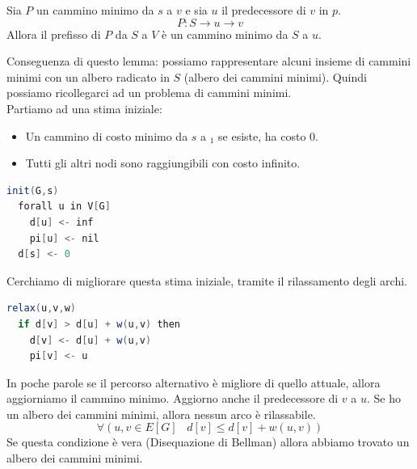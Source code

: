 \documentclass[a4paper]{article}
\begin{document}
\begin{lemma}
  Sia $P$ un cammino minimo da $s$ a $v$ e sia $u$ il predecessore di $v$ in $p$. 
  \[P: S \rightarrow  u \rightarrow v\]
  Allora il prefisso di $P$ da $S$ a $V$ è un cammino minimo da $S$ a $u$.
\end{lemma}
\noindent
Conseguenza di questo lemma: possiamo rappresentare alcuni insieme di cammini minimi con un albero radicato in $S$ (albero dei cammini minimi).
Quindi possiamo ricollegarci ad un problema di cammini minimi.\\
Partiamo ad una stima iniziale:
\begin{itemize}
  \item Un cammino di costo minimo da $s$ a $_1$ se esiste, ha costo $0$.
  \item Tutti gli altri nodi sono raggiungibili con costo infinito.
\end{itemize}
\begin{lstlisting}[language=Scala]
init(G,s) 
  forall u in V[G]
    d[u] <- inf
    pi[u] <- nil
  d[s] <- 0
\end{lstlisting}
\noindent
Cerchiamo di migliorare questa stima iniziale, tramite il rilassamento degli archi.
\begin{lstlisting}[language=Scala]
relax(u,v,w)
  if d[v] > d[u] + w(u,v) then
    d[v] <- d[u] + w(u,v)
    pi[v] <- u
\end{lstlisting}
\begin{figure}[H]
  \centering


\end{figure}
In poche parole se il percorso alternativo è migliore di quello attuale, allora aggiorniamo il cammino minimo. Aggiorno anche il predecessore di $v$ a $u$.
Se ho un albero dei cammini minimi, allora nessun arco è rilassabile.
\[\forall (u,v \in E[G] \; \; \; d[v] \le d[v] + w(u,v))\]
Se questa condizione è vera (Disequazione di Bellman) allora abbiamo trovato un albero dei cammini minimi.
\end{document}
